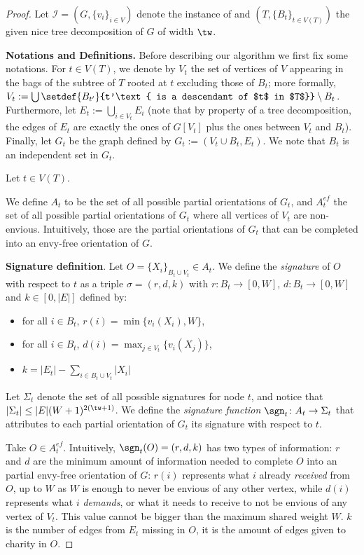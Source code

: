 \documentclass[11pt,letterpaper]{article}
\begin{document}
\begin{proof}
    Let $\mathcal{I} = (G,\{v_i\}_{i\in V})$ denote the instance of {\EFmc}
    and $(T,\{B_t\}_{t\in V(T)})$ the given nice tree decomposition of $G$ of width $\tw$.


    \textbf{Notations and Definitions.}
    Before describing our algorithm we first fix some notations.
    For $t \in V(T)$, we denote by $V_t$ the set of vertices of $V$ appearing in the bags of the subtree of $T$ rooted at $t$
    excluding those of $B_t$;
    more formally, $V_t := \bigcup\setdef{B_{t'}}{t'\text{ is a descendant of $t$ in $T$}} \setminus B_t$.
    Furthermore, let $E_t:=\bigcup_{i\in V_t}E_i$
    (note that by property of a tree decomposition, the edges of $E_t$ are exactly the ones of $G[V_t]$ plus the ones between $V_t$ and $B_t$).
    Finally, let $G_t$ be the graph defined by $G_t:=(V_t\cup B_t,E_t)$. We note that $B_t$ is an independent set in $G_t$.

    Let $t\in V(T)$.

    We define $A_t$ to be the set of all possible partial orientations of $G_t$, and $A^{ef}_t$ the set of all possible partial orientations of $G_t$ where all vertices of $V_t$ are non-envious. Intuitively, those are the partial orientations of $G_t$ that can be completed into an envy-free orientation of $G$.

    \textbf{Signature definition}. Let $O=\{X_i\}_{B_t\cup V_t}\in A_t$. We define the \emph{signature} of $O$ with respect to $t$
    as a triple $\sigma=(r,d,k)$ with $r\colon B_t \to [ 0,W ]$, $d\colon B_t \to [ 0,W ]$ and $k\in [0,|E|]$ defined by:
    \begin{itemize}
        \item for all $i\in B_t$, $r(i)= \min\{ v_{i} (X_{i}),W \}$,
        \item for all $i\in B_t$, $d(i)=\max_{j\in V_t}\{v_i(X_j)\}$,
        \item $k=|E_t|-\sum_{i\in B_t\cup V_t}|X_i|$
    \end{itemize}

    Let $\Sigma_t$ denote the set of all possible signatures for node $t$, and notice that $|\Sigma_t| \le |E|(W+1)^{2(\tw+1)}$.
    We define the \emph{signature function} $\sgn_t \colon A_t \to \Sigma_t$ that attributes to each partial orientation of $G_t$ its signature with respect to $t$.

    Take $O\in A_t^{ef}$. Intuitively, $\sgn_t(O)=(r,d,k)$ has two types of information: $r$ and $d$ are the minimum amount of information needed to complete $O$ into an partial envy-free orientation of $G$: $r(i)$ represents what $i$ already \emph{received} from $O$, up to $W$ as $W$ is enough to never be envious of any other vertex, while $d(i)$ represents what $i$ \emph{demands}, or what it needs to receive to not be envious of any vertex of $V_t$. This value cannot be bigger than the maximum shared weight $W$. $k$ is the number of edges from $E_t$ missing in $O$, it is the amount of edges given to charity in $O$.


\end{proof}
\end{document}
